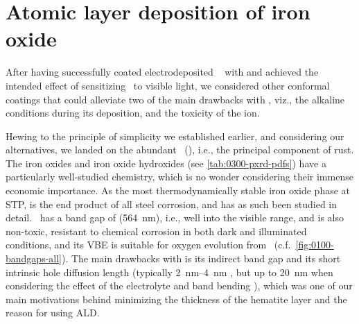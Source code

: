 \documentclass[webedition,openright,titles,swedish,english]{LuaUUThesis}\usepackage[]{graphicx}\usepackage[]{xcolor}
\newcommand{\ie}{i.e.}
\newcommand{\viz}{viz.}
\newcommand{\namely}{\viz}
\newcommand{\cf}{c.f.}
\begin{document}
\section{Atomic layer deposition of iron oxide}
\label{synthesis:atomic-layer-deposition}

After having successfully coated electrodeposited \zincox\  with
 and achieved the intended effect of sensitizing \ZnO\ to visible
light, we considered other conformal coatings
that could alleviate two of the main drawbacks with , \namely,
the alkaline conditions during its deposition, and the toxicity of the  ion.

Hewing to the principle of simplicity we established earlier, and considering
our alternatives, we landed on the abundant
\hematite\ (), \ie, the principal component of rust.
The iron oxides and iron oxide hydroxides (see \cref{tab:0300-pxrd-pdfs}) have
a particularly well-studied
chemistry, which is no wonder considering their immense economic importance.
As the most thermodynamically stable iron oxide phase at \gls{STP},  is
the end product of all steel corrosion, and has as such been studied in detail.
\hematite\ has a band gap of  (\qty{564}{\nm}), \ie, well into the visible
range, and is also non-toxic, resistant to chemical corrosion in both dark and
illuminated conditions, and its \gls{VBE} is suitable for oxygen evolution
from \water\ (\cf\ \cref{fig:0100-bandgaps-all}).
The main drawbacks with  is its indirect band gap and its short
intrinsic hole diffusion length (typically \qtyrange{2}{4}{\nm} \cite{Kennedy1978},
but up to \qty{20}{\nm} when considering the effect of the electrolyte and band bending
\cite{Edvinsson2018}), which was one of our main motivations behind minimizing the thickness
of the \gls{hematite} layer and the reason for using \gls{ALD}.

%

\end{document}
